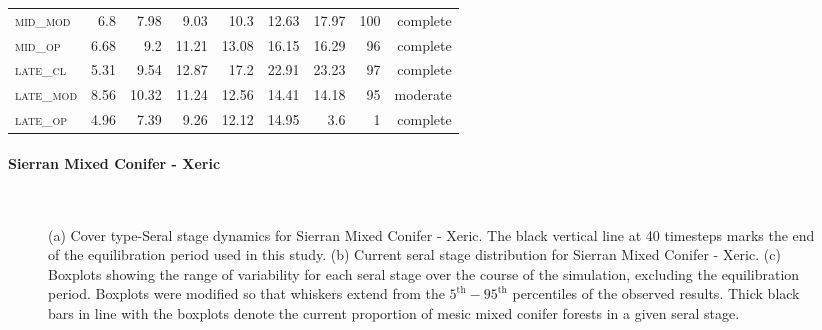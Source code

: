 \begin{table}[!htbp]
\begin{tabular}{@{}lrrrrr|rrr@{}}
\textsc{mid\_mod  }        &   6.8         &  7.98    &  9.03      &  10.3    &  12.63     &  17.97    &  100   &  complete     \\
\textsc{mid\_op   }        &   6.68        &  9.2     &  11.21     &  13.08   &  16.15     &  16.29    &  96    &  complete     \\
\textsc{late\_cl  }        &   5.31        &  9.54    &  12.87     &  17.2    &  22.91     &  23.23    &  97    &  complete      \\
\textsc{late\_mod }        &   8.56        &  10.32   &  11.24     &  12.56   &  14.41     &  14.18    &  95    &  moderate      \\
\textsc{late\_op  }        &   4.96        &  7.39    &  9.26      &  12.12   &  14.95     &  3.6      &  1     &  complete      \\
\bottomrule
\end{tabular}
\end{table}





\paragraph*{Sierran Mixed Conifer - Xeric}

\begin{figure}[!htbp]
  \centering
   \\
  \caption{(a) Cover type-Seral stage dynamics for Sierran Mixed Conifer - Xeric. The black vertical line at 40 timesteps marks the end of the equilibration period used in this study. (b) Current seral stage distribution for Sierran Mixed Conifer - Xeric. (c) Boxplots showing the range of variability for each seral stage over the course of the simulation, excluding the equilibration period. Boxplots were modified so that whiskers extend from the $5^{\text{th}} - 95^{\text{th}}$ percentiles of the observed results. Thick black bars in line with the boxplots denote the current proportion of mesic mixed conifer forests in a given seral stage.}  
  \label{fig:hrv-covcond_smcx}
\end{figure}

